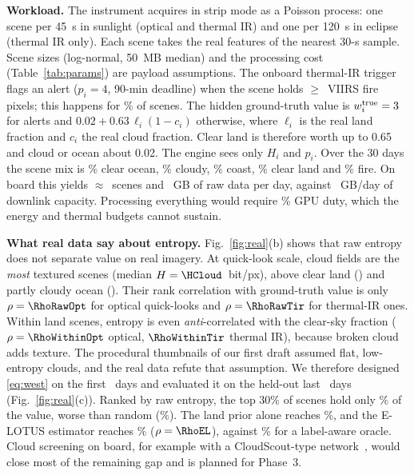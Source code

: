 \documentclass[conference]{IEEEtran}
\theoremstyle{remark}
\begin{document}
\textbf{Workload.} The instrument acquires in strip mode as a Poisson process: one scene per \SI{45}{s} in sunlight (optical and thermal IR) and one per \SI{120}{s} in eclipse (thermal IR only). Each scene takes the real features of the nearest 30-s sample. Scene sizes (log-normal, \SI{50}{MB} median) and the processing cost (Table~\ref{tab:params}) are payload assumptions. The onboard thermal-IR trigger flags an alert ($p_i=4$, 90-min deadline) when the scene holds $\ge$\FireThr\ VIIRS fire pixels; this happens for \AlertRate\% of scenes. The hidden ground-truth value is $w_i^{\rm true}=3$ for alerts and $0.02+0.63\,\ell_i(1-c_i)$ otherwise, where $\ell_i$ is the real land fraction and $c_i$ the real cloud fraction. Clear land is therefore worth up to 0.65 and cloud or ocean about 0.02. The engine sees only $H_i$ and $p_i$. Over the 30 days the scene mix is \ShareOcean\% clear ocean, \ShareCloud\% cloudy, \ShareCoast\% coast, \ShareLand\% clear land and \ShareFire\% fire. On board this yields $\approx$\GenPerDay\ scenes and \RawGBDay~GB of raw data per day, against \DlGBDay~GB/day of downlink capacity. Processing everything would require \DemandDuty\% GPU duty, which the energy and thermal budgets cannot sustain.

\textbf{What real data say about entropy.} Fig.~\ref{fig:real}(b) shows that raw entropy does not separate value on real imagery. At quick-look scale, cloud fields are the \emph{most} textured scenes (median $H=\HCloud$~bit/px), above clear land (\HLand) and partly cloudy ocean (\HOcean). Their rank correlation with ground-truth value is only $\rho=\RhoRawOpt$ for optical quick-looks and $\rho=\RhoRawTir$ for thermal-IR ones. Within land scenes, entropy is even \emph{anti}-correlated with the clear-sky fraction ($\rho=\RhoWithinOpt$ optical, $\RhoWithinTir$ thermal IR), because broken cloud adds texture. The procedural thumbnails of our first draft assumed flat, low-entropy clouds, and the real data refute that assumption. We therefore designed \eqref{eq:west} on the first \HalfDays\ days and evaluated it on the held-out last \HalfDays\ days (Fig.~\ref{fig:real}(c)). Ranked by raw entropy, the top 30\% of scenes hold only \CapRaw\% of the value, worse than random (\CapRandom\%). The land prior alone reaches \CapLand\%, and the E-LOTUS estimator reaches \CapEL\% ($\rho=\RhoEL$), against \CapOracle\% for a label-aware oracle. Cloud screening on board, for example with a CloudScout-type network~\cite{giuffrida2022phisat}, would close most of the remaining gap and is planned for Phase~3.
\end{document}

